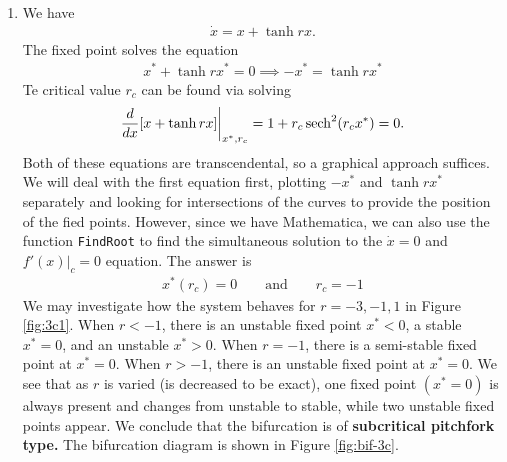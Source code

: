 \documentclass{article}
\theoremstyle{definition}
\newcommand{\f}[2]{\frac{#1}{#2}}
\begin{document}
\begin{enumerate}[label=(\alph*)]
	\item  We have
	\begin{align*}
	\dot x = x + \tanh rx.
	\end{align*}
	The fixed point solves the equation
	\begin{align*}
	x^* + \tanh rx^* = 0 \implies - x^* =  \tanh rx^*
	\end{align*}
	Te critical value $r_c$ can be found via solving 
	\begin{align*}
	\f{d}{dx} [x + \tanh rx] \bigg\vert_{x^*, r_c} = 1 + r_c \sech^2(r_c x^*) = 0.
	\end{align*}
	Both of these equations are transcendental, so a graphical approach suffices. We will deal with the first equation first, plotting $-x^*$ and $\tanh rx^*$ separately and looking for intersections of the curves to provide the position of the fied points. However, since we have Mathematica, we can also use the function \texttt{FindRoot} to find the simultaneous solution to the $\dot x = 0$ and $f'(x)\vert_c=0$ equation. The answer is 
	\begin{align*}
	\boxed{x^*(r_c) = 0 \quad\quad\text{and}\quad\quad r_c = -1}
	\end{align*}
	We may investigate how the system behaves for $r=-3,-1,1$ in Figure \ref{fig:3c1}. When $r<-1$, there is an unstable fixed point $x^* < 0$, a stable $x^* = 0$, and an unstable $x^* > 0$. When $r=-1$, there is a semi-stable fixed point at $x^* = 0$. When $r>-1$, there is an unstable fixed point at $x^* = 0$. We see that as $r$ is varied (is decreased to be exact), one fixed point $(x^*= 0)$ is always present and changes from unstable to stable, while two unstable fixed points appear. We conclude that the bifurcation is of \textbf{subcritical pitchfork type.} The bifurcation diagram is shown in Figure \ref{fig:bif-3c}.
	

\end{enumerate}
\end{document}
